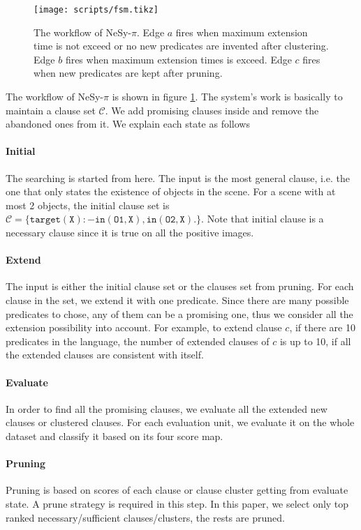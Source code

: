 \documentclass[
]{ceurart}
\begin{document}
	\begin{figure}[t]
		\centering
		\texttt{[image: scripts/fsm.tikz]}
		\caption{The workflow of NeSy-$ \pi $. Edge $ a $ fires when maximum extension time is not exceed or no new predicates are invented after clustering. Edge $ b $ fires when maximum extension times is exceed. Edge $ c $ fires when new predicates are kept after pruning.}
		\label{fig:nesy-pi-workflow.}
	\end{figure}
	
	The workflow of NeSy-$ \pi $ is shown in figure \ref{fig:nesy-pi-workflow.}. The system's work is basically to maintain a clause set $ \mathcal{C} $. We add promising clauses inside and remove the abandoned ones from it. We explain each state as follows
	\paragraph{Initial}
	The searching is started from here. The input is the most general clause, i.e. the one that only states the existence of objects in the scene. For a scene with at most 2 objects, the initial clause set is $ \mathcal{C} = \{\mathtt{target(X):-in(O1,X),in(O2,X).} \} $. Note that initial clause is a necessary clause since it is true on all the positive images.
	
	\paragraph{Extend}
	The input is either the initial clause set or the clauses set from pruning. For each clause in the set, we extend it with one predicate. Since there are many possible predicates to chose, any of them can be a promising one, thus we consider all the extension possibility into account. For example, to extend clause $ c $, if there are 10 predicates in the language, the number of extended clauses of $ c $ is up to 10, if all the extended clauses are consistent with itself.
	
	\paragraph{Evaluate}
	In order to find all the promising clauses, we evaluate all the extended new clauses or clustered clauses. For each evaluation unit, we evaluate it on the whole dataset and classify it based on its four score map.
	
	\paragraph{Pruning}
	Pruning is based on scores of each clause or clause cluster getting from evaluate state. A prune strategy is required in this step. In this paper, we select only top ranked necessary/sufficient clauses/clusters, the rests are pruned. 
	
\end{document}

